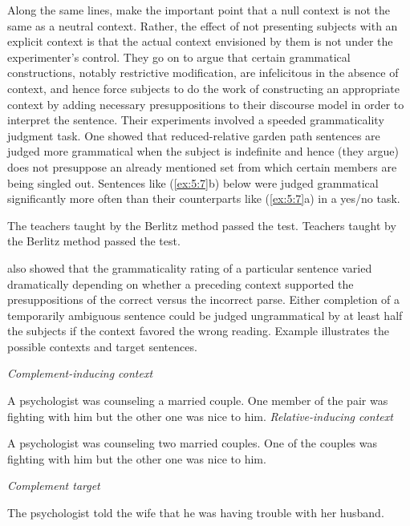 \enlargethispage{\baselineskip}
Along the same lines, \citet{CrainSteedman1985} make the important point that a null context is not the same as a neutral context. Rather, the effect of not presenting subjects with an explicit context is that the actual context envisioned by them is not under the experimenter's control. They go on to argue that certain grammatical constructions, notably restrictive modification, are infelicitous in the
absence of context, and hence force subjects to do the work of constructing an appropriate context by adding necessary presuppositions to their discourse model in order to interpret the sentence. Their experiments involved a speeded grammaticality judgment task. One showed that reduced-relative garden path sentences are judged more grammatical when the subject is indefinite and hence (they argue) does not presuppose an already mentioned set from which certain members are being singled out. Sentences like (\ref{ex:5:7}b) below were judged grammatical significantly more often than their counterparts like (\ref{ex:5:7}a) in a yes/no task.

\ea\label{ex:5:7}
\ea The teachers taught by the Berlitz method passed the test.
\ex  Teachers taught by the Berlitz method passed the test.
\z
\z

\noindent
\citeauthor{CrainSteedman1985} also showed that the grammaticality rating of a particular sentence varied dramatically depending on whether a preceding context supported the presuppositions of the correct versus the incorrect parse. Either completion of a temporarily ambiguous sentence could be judged ungrammatical by at least half the subjects if the context favored the wrong reading. Example  illustrates the possible contexts and target sentences.

\ea\label{ex:5:8}
\ea       \textit{Complement-inducing  context}

A psychologist was counseling a married couple. One member of the pair was fighting with him but the other one was nice to him.
\ex  \textit{Relative-inducing  context}

A psychologist was counseling two married couples. One of the couples was fighting with him but the other one was nice to him.

\ex  \textit{Complement  target}

The psychologist told the wife that he was having trouble with her husband.

